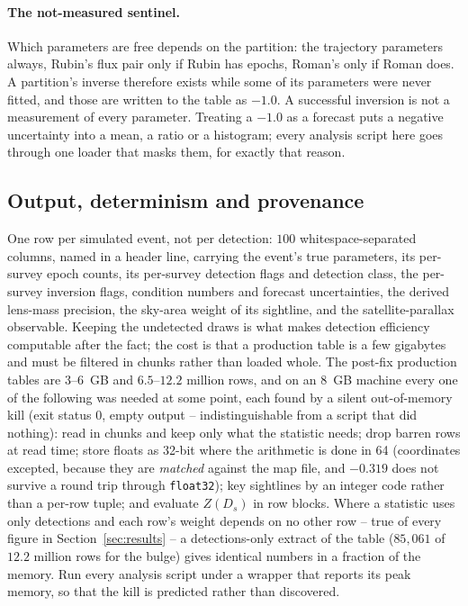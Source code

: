 \documentclass[english,10pt,a4paper]{article}
\begin{document}
	\paragraph{The not-measured sentinel.} Which parameters are free depends on the partition: the trajectory parameters always, Rubin's flux pair only if Rubin has epochs, Roman's only if Roman does. A partition's inverse therefore exists while some of its parameters were never fitted, and those are written to the table as $-1.0$. A successful inversion is not a measurement of every parameter. Treating a $-1.0$ as a forecast puts a negative uncertainty into a mean, a ratio or a histogram; every analysis script here goes through one loader that masks them, for exactly that reason.

	\subsection{Output, determinism and provenance}

	One row per simulated event, not per detection: $100$ whitespace-separated columns, named in a header line, carrying the event's true parameters, its per-survey epoch counts, its per-survey detection flags and detection class, the per-survey inversion flags, condition numbers and forecast uncertainties, the derived lens-mass precision, the sky-area weight of its sightline, and the satellite-parallax observable. Keeping the undetected draws is what makes detection efficiency computable after the fact; the cost is that a production table is a few gigabytes and must be filtered in chunks rather than loaded whole. The post-fix production tables are $3$--$6$~GB and $6.5$--$12.2$ million rows, and on an $8$~GB machine every one of the following was needed at some point, each found by a silent out-of-memory kill (exit status $0$, empty output -- indistinguishable from a script that did nothing): read in chunks and keep only what the statistic needs; drop barren rows at read time; store floats as 32-bit where the arithmetic is done in 64 (coordinates excepted, because they are \emph{matched} against the map file, and $-0.319$ does not survive a round trip through \texttt{float32}); key sightlines by an integer code rather than a per-row tuple; and evaluate $Z(D_s)$ in row blocks. Where a statistic uses only detections and each row's weight depends on no other row -- true of every figure in Section~\ref{sec:results} -- a detections-only extract of the table ($85{,}061$ of $12.2$ million rows for the bulge) gives identical numbers in a fraction of the memory. Run every analysis script under a wrapper that reports its peak memory, so that the kill is predicted rather than discovered.
\end{document}
